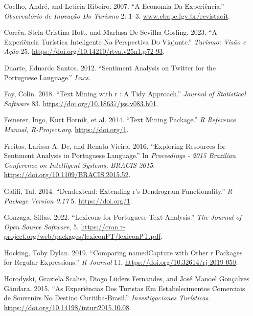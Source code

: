 \documentclass[preprint, 3p,
authoryear]{elsarticle} %
\newlength{\cslhangindent}
\newlength{\cslentryspacingunit} %
\newenvironment{CSLReferences}[2] %
 {%
  \setlength{\parindent}{0pt}
  \ifodd #1
  \let\oldpar\par
  \def\par{\hangindent=\cslhangindent\oldpar}
  \fi
  \setlength{\parskip}{#2\cslentryspacingunit}
 }%
 {}
\begin{document}
\begin{CSLReferences}{1}{0}
\leavevmode{}%
Coelho, André, and Leticia Ribeiro. 2007. {``A Economia Da
Experiência.''} \emph{Observatório de Inovação Do Turismo} 2: 1--3.
\href{https://www.ebape.fgv.br/revistaoit}{www.ebape.fgv.br/revistaoit}.

\leavevmode{}%
Corrêa, Stela Cristina Hott, and Marlusa De Sevilha Gosling. 2023. {``A
Experiência Turística Inteligente Na Perspectiva Do Viajante.''}
\emph{Turismo: Visão e Ação} 25.
\url{https://doi.org/10.14210/rtva.v25n1.p72-93}.

\leavevmode{}%
Duarte, Eduardo Santos. 2012. {``Sentiment Analysis on Twitter for the
Portuguese Language.''} \emph{Lncs}.

\leavevmode{}%
Fay, Colin. 2018. {``Text Mining with r : A Tidy Approach.''}
\emph{Journal of Statistical Software} 83.
\url{https://doi.org/10.18637/jss.v083.b01}.

\leavevmode{}%
Feinerer, Ingo, Kurt Hornik, et al. 2014. {``Text Mining Package.''}
\emph{R Reference Manual, R-Project.org}. \url{https://doi.org/1}.

\leavevmode{}%
Freitas, Larissa A. De, and Renata Vieira. 2016. {``Exploring Resources
for Sentiment Analysis in Portuguese Language.''} In \emph{Proceedings -
2015 Brazilian Conference on Intelligent Systems, BRACIS 2015}.
\url{https://doi.org/10.1109/BRACIS.2015.52}.

\leavevmode{}%
Galili, Tal. 2014. {``Dendextend: Extending r's Dendrogram
Functionality.''} \emph{R Package Version 0.17} 5.
\url{https://doi.org/1}.

\leavevmode{}%
Gonzaga, Sillas. 2022. {``Lexicons for Portuguese Text Analysis.''}
\emph{The Journal of Open Source Software}, 5.
\url{https://cran.r-project.org/web/packages/lexiconPT/lexiconPT.pdf}.

\leavevmode{}%
Hocking, Toby Dylan. 2019. {``Comparing namedCapture with Other r
Packages for Regular Expressions.''} \emph{R Journal} 11.
\url{https://doi.org/10.32614/rj-2019-050}.

\leavevmode{}%
Horodyski, Graziela Scalise, Diogo Lüders Fernandes, and José Manoel
Gonçalves Gândara. 2015. {``As Experiências Dos Turistas Em
Estabelecimentos Comerciais de Souvenirs No Destino Curitiba-Brasil.''}
\emph{Investigaciones Turísticas}.
\url{https://doi.org/10.14198/inturi2015.10.08}.


\end{CSLReferences}
\end{document}
